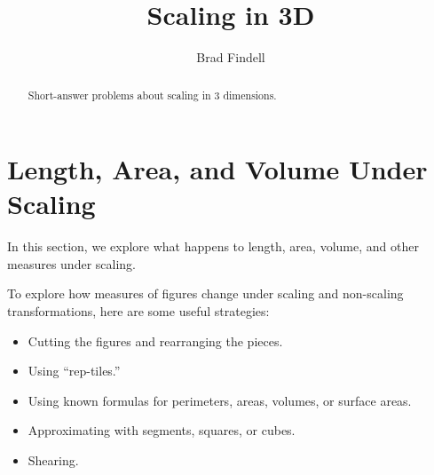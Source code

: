 \documentclass[nooutcomes]{ximera}
\title{Scaling in 3D}
\author{Brad Findell}
\begin{document}
\begin{abstract}
Short-answer problems about scaling in 3 dimensions. 
\end{abstract}
\maketitle




\section{Length, Area, and Volume Under Scaling}
In this section, we explore what happens to length, area, volume, and other measures under scaling.  
 
To explore how measures of figures change under scaling and non-scaling transformations, here are some useful strategies: 
\begin{itemize}
\item Cutting the figures and rearranging the pieces.  
\item Using ``rep-tiles.'' 
\item Using known formulas for perimeters, areas, volumes, or surface areas. 
\item Approximating with segments, squares, or cubes.  
\item Shearing. 
\end{itemize}

\end{document}
